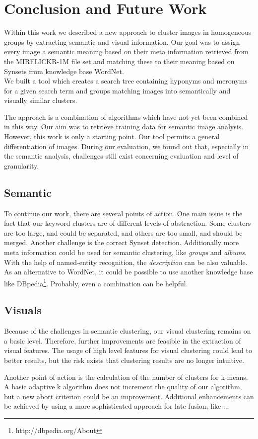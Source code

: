 %
\section{Conclusion and Future Work}
\label{sec_future}

Within this work we described a new approach to cluster images in homogeneous groups by extracting semantic and visual information. Our goal was to assign every image a semantic meaning based on their meta information retrieved from the MIRFLICKR-1M file set and matching these to their meaning based on Synsets from knowledge base WordNet.
\\ We built a tool which creates a search tree containing hyponyms and meronyms for a given search term and groups matching images into semantically and visually similar clusters.

\bigskip
The approach is a combination of algorithms which have not yet been combined in this way. Our aim was to retrieve training data for semantic image analysis. However, this work is only a starting point. Our tool permits a general differentiation of images. During our evaluation, we found out that, especially in the semantic analysis, challenges still exist concerning evaluation and level of granularity.

\subsection{Semantic}
To continue our work, there are several points of action. One main issue is the fact that our keyword clusters are of different levels of abstraction. Some clusters are too large, and could be separated, and others are too small, and should be merged. Another challenge is the correct Synset detection. Additionally more meta information could be used for semantic clustering, like \emph{groups} and \emph{albums}. With the help of named-entity recognition, the \emph{description} can be also valuable. As an alternative to WordNet, it could be possible to use another knowledge base like DBpedia\footnote{http://dbpedia.org/About}. Probably, even a combination can be helpful.

\subsection{Visuals}

Because of the challenges in semantic clustering, our visual clustering remains on a basic level. Therefore, further improvements are feasible in the extraction of visual features. The usage of high level features for visual clustering could lead to better results, but the risk exists that clustering results are no longer intuitive. 

Another point of action is the calculation of the number of clusters for k-means. A basic adaptive k algorithm does not increment the quality of our algorithm, but a new abort criterion could be an improvement. Additional enhancements can be achieved by using a more sophisticated approach for late fusion, like ...  